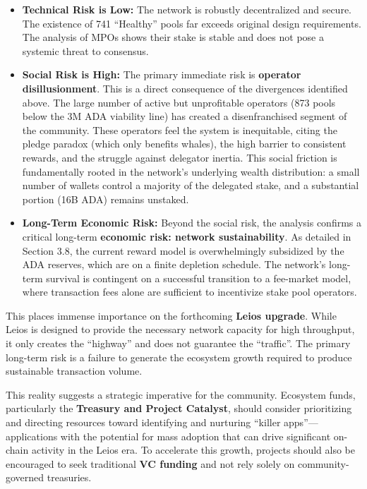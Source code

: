 \documentclass[11pt, letterpaper]{article}
\begin{document}
\begin{itemize}
	\item \textbf{Technical Risk is Low:} The network is robustly decentralized and secure. The existence
	      of 741 ``Healthy'' pools far exceeds original design requirements. The analysis of MPOs shows their stake
	      is stable and does not pose a systemic threat to consensus.
	\item \textbf{Social Risk is High:} The primary immediate risk is \textbf{operator disillusionment}.
	      This is a direct consequence of the divergences identified above. The large number of active but unprofitable
	      operators (873 pools below the 3M ADA viability line) has created a disenfranchised segment of the community.
	      These operators feel the system is inequitable, citing the pledge paradox (which only benefits whales), the
	      high barrier to consistent rewards, and the struggle against delegator inertia. This social friction is
	      fundamentally rooted in the network's underlying wealth distribution: a small number of wallets control a
	      majority of the delegated stake, and a substantial portion (16B ADA) remains unstaked.
	\item \textbf{Long-Term Economic Risk:} Beyond the social risk, the analysis confirms a critical
	      long-term \textbf{economic risk: network sustainability}. As detailed in Section 3.8, the current reward
	      model is overwhelmingly subsidized by the ADA reserves, which are on a finite depletion schedule. The
	      network's long-term survival is contingent on a successful transition to a fee-market model, where transaction
	      fees alone are sufficient to incentivize stake pool operators.
\end{itemize}

This places immense importance on the forthcoming \textbf{Leios upgrade}. While Leios is designed to provide the
necessary network capacity for high throughput, it only creates the ``highway'' and does not guarantee the ``traffic''.
The primary long-term risk is a failure to generate the ecosystem growth required to produce sustainable
transaction volume.

This reality suggests a strategic imperative for the community. Ecosystem funds, particularly
the \textbf{Treasury and Project Catalyst}, should consider prioritizing and directing resources
toward identifying and nurturing ``killer apps''—applications with the potential for mass adoption that
can drive significant on-chain activity in the Leios era. To accelerate this growth, projects should
also be encouraged to seek traditional \textbf{VC funding} and not rely solely on community-governed treasuries.
\end{document}
